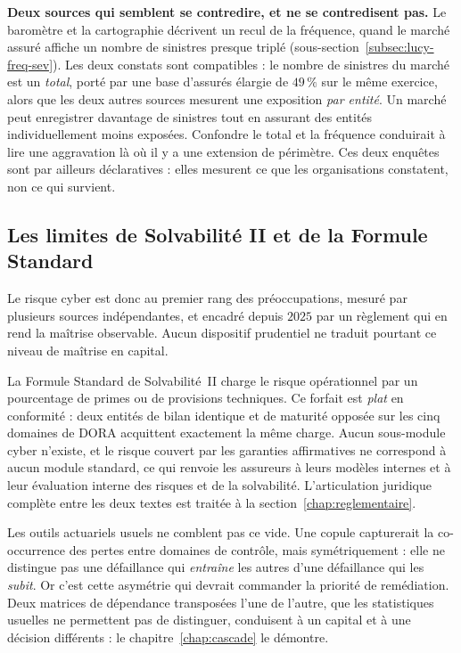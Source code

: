 \begin{attention}
\textbf{Deux sources qui semblent se contredire, et ne se contredisent pas.} Le baromètre et la
cartographie décrivent un recul de la fréquence, quand le marché assuré affiche un nombre de
sinistres presque triplé (sous-section~\ref{subsec:lucy-freq-sev}). Les deux constats sont
compatibles : le nombre de sinistres du marché est un \emph{total}, porté par une base d'assurés
élargie de $49\,\%$ sur le même exercice, alors que les deux autres sources mesurent une
exposition \emph{par entité}. Un marché peut enregistrer davantage de sinistres tout en assurant
des entités individuellement moins exposées. Confondre le total et la fréquence conduirait à lire
une aggravation là où il y a une extension de périmètre. Ces deux enquêtes sont par ailleurs
déclaratives : elles mesurent ce que les organisations constatent, non ce qui survient.
\end{attention}

\subsection{Les limites de Solvabilité II et de la Formule Standard}

Le risque cyber est donc au premier rang des préoccupations, mesuré par plusieurs sources
indépendantes, et encadré depuis $2025$ par un règlement qui en rend la maîtrise observable.
Aucun dispositif prudentiel ne traduit pourtant ce niveau de maîtrise en capital.

La Formule Standard de Solvabilité~II charge le risque opérationnel par un pourcentage de primes
ou de provisions techniques. Ce forfait est \emph{plat} en conformité : deux entités de bilan
identique et de maturité opposée sur les cinq domaines de DORA acquittent exactement la même
charge. Aucun sous-module cyber n'existe, et le risque couvert par les garanties affirmatives ne
correspond à aucun module standard, ce qui renvoie les assureurs à leurs modèles internes et à
leur évaluation interne des risques et de la solvabilité. L'articulation juridique complète entre
les deux textes est traitée à la section~\ref{chap:reglementaire}.

Les outils actuariels usuels ne comblent pas ce vide. Une copule capturerait la co-occurrence des
pertes entre domaines de contrôle, mais symétriquement : elle ne distingue pas une défaillance
qui \emph{entraîne} les autres d'une défaillance qui les \emph{subit}. Or c'est cette asymétrie
qui devrait commander la priorité de remédiation. Deux matrices de dépendance transposées l'une
de l'autre, que les statistiques usuelles ne permettent pas de distinguer, conduisent à un
capital et à une décision différents : le chapitre~\ref{chap:cascade} le démontre.


